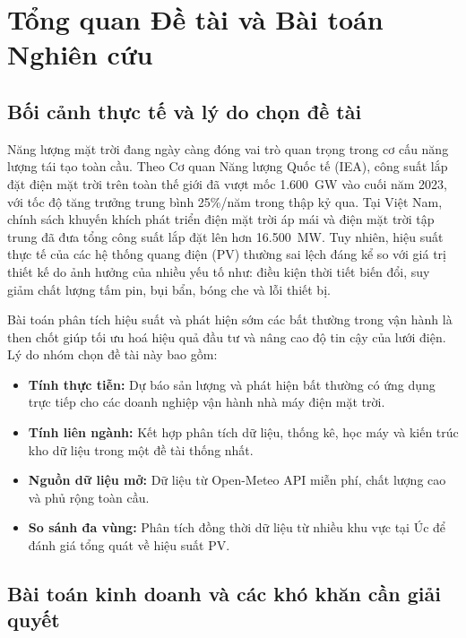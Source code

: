 \documentclass[12pt, a4paper]{report}
\begin{document}
\newpage
\pagestyle{main}

\chapter{Tổng quan Đề tài và Bài toán Nghiên cứu}
\label{chap:tongquan}

\section{Bối cảnh thực tế và lý do chọn đề tài}
\label{sec:lydo}

Năng lượng mặt trời đang ngày càng đóng vai trò quan trọng trong cơ cấu năng lượng tái tạo toàn cầu. Theo Cơ quan Năng lượng Quốc tế (IEA), công suất lắp đặt điện mặt trời trên toàn thế giới đã vượt mốc 1.600~GW vào cuối năm 2023, với tốc độ tăng trưởng trung bình 25\%/năm trong thập kỷ qua. Tại Việt Nam, chính sách khuyến khích phát triển điện mặt trời áp mái và điện mặt trời tập trung đã đưa tổng công suất lắp đặt lên hơn 16.500~MW. Tuy nhiên, hiệu suất thực tế của các hệ thống quang điện (PV) thường sai lệch đáng kể so với giá trị thiết kế do ảnh hưởng của nhiều yếu tố như: điều kiện thời tiết biến đổi, suy giảm chất lượng tấm pin, bụi bẩn, bóng che và lỗi thiết bị.

Bài toán phân tích hiệu suất và phát hiện sớm các bất thường trong vận hành là then chốt giúp tối ưu hoá hiệu quả đầu tư và nâng cao độ tin cậy của lưới điện. Lý do nhóm chọn đề tài này bao gồm:
\begin{itemize}[noitemsep]
    \item \textbf{Tính thực tiễn:} Dự báo sản lượng và phát hiện bất thường có ứng dụng trực tiếp cho các doanh nghiệp vận hành nhà máy điện mặt trời.
    \item \textbf{Tính liên ngành:} Kết hợp phân tích dữ liệu, thống kê, học máy và kiến trúc kho dữ liệu trong một đề tài thống nhất.
    \item \textbf{Nguồn dữ liệu mở:} Dữ liệu từ Open-Meteo API miễn phí, chất lượng cao và phủ rộng toàn cầu.
    \item \textbf{So sánh đa vùng:} Phân tích đồng thời dữ liệu từ nhiều khu vực tại Úc để đánh giá tổng quát về hiệu suất PV.
\end{itemize}


\section{Bài toán kinh doanh và các khó khăn cần giải quyết}
\label{sec:problem}
\end{document}
